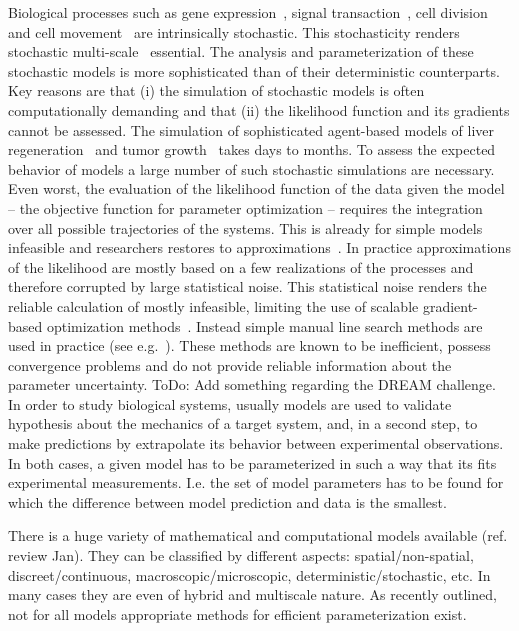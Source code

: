\documentclass[10pt,letterpaper]{article}
\newcommand{\jh}[1]{{\color{red}#1}}
\begin{document}
Biological processes such as gene expression~\cite{ElowitzLev2002,EldarElo2010}, signal transaction~\cite{NiepelSpe2009,KlannLap2009}, cell division~\cite{HuhPau2011} and cell movement~\cite{GranerGlazier1992,AndersonQua2008} are intrinsically stochastic. This stochasticity renders stochastic multi-scale~\cite{DadaMen2011,WalpolePap2013,HasenauerJag2015} essential. The analysis and parameterization of these stochastic models is more sophisticated than of their deterministic counterparts. Key reasons are that (i) the simulation of stochastic models is often computationally demanding and that (ii) the likelihood function and its gradients cannot be assessed. The simulation of sophisticated agent-based models of liver regeneration~\cite{HoehmeBru2010} and tumor growth~\cite{AndersonQua2008,Jagiella2012} takes days to months. To assess the expected behavior of models a large number of such stochastic simulations are necessary. Even worst, the evaluation of the likelihood function of the data given the model -- the objective function for parameter optimization -- requires the integration over all possible trajectories of the systems. This is already for simple models infeasible and researchers restores to approximations~\cite{Dargatz2010}. In practice approximations of the likelihood are mostly based on a few realizations of the processes and therefore corrupted by large statistical noise. This statistical noise renders the reliable calculation of mostly infeasible, limiting the use of scalable gradient-based optimization methods~\cite{RaueSch2013}. Instead simple manual line search methods are used in practice (see e.g.~\cite{KarrSan2012,Jagiella2015}). These methods are known to be inefficient, possess convergence problems and do not provide reliable information about the parameter uncertainty. \jh{ToDo: Add something regarding the DREAM challenge.}
In order to study biological systems, usually models are used to validate hypothesis about the mechanics of a target system, and, in a second step, to make predictions by extrapolate its behavior between experimental observations. In both cases, a given model has to be parameterized in such a way that its fits experimental measurements. I.e. the set of model parameters has to be found for which the difference between model prediction and data is the smallest.

There is a huge variety of mathematical and computational models available (ref. review Jan). They can be classified by different aspects: spatial/non-spatial, discreet/continuous, macroscopic/microscopic, deterministic/stochastic, etc. In many cases they are even of hybrid and multiscale nature. As recently outlined, not for all models appropriate methods for efficient parameterization exist.
\end{document}
